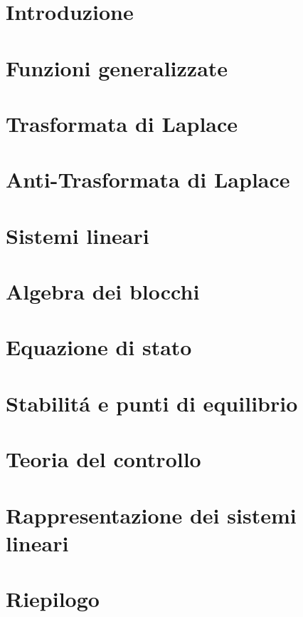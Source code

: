 \documentclass{report}
\begin{document}
	
	
	
	\titleTdS
	\pagebreak
	\pagebreak
	\tableofcontents
	\pagebreak
	\listofexercises
	\pagebreak
	\chapter{Introduzione}
		
	\pagebreak
	\chapter{Funzioni generalizzate}
	
	\pagebreak
	\chapter{Trasformata di Laplace}
	
	\pagebreak
	\chapter{Anti-Trasformata di Laplace}
	
	\pagebreak
	\chapter{Sistemi lineari}
	
	
	
	
	
	\pagebreak
	\chapter{Algebra dei blocchi}
	
	
	\pagebreak
	\chapter{Equazione di stato}
	
	\pagebreak
	\chapter{Stabilit\'a e punti di equilibrio}
	
	\pagebreak
	\chapter{Teoria del controllo}
	
	
	
	
	
	
	\pagebreak
	\chapter{Rappresentazione dei sistemi lineari}
	
	
	\chapter{Riepilogo}
	
	\pagebreak
	
	\pagebreak
	
\end{document}
